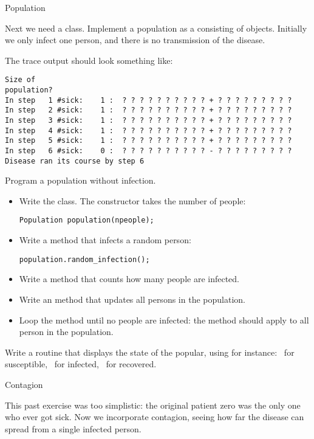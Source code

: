  {Population}

\prerequisite{\ref{ch:array}}

Next we need a  class. Implement a population as a 
consisting of  objects. Initially we only infect one person, and there
is no transmission of the disease.

The trace output should look something like:
\begin{verbatim}
Size of
population?
In step   1 #sick:    1 :  ? ? ? ? ? ? ? ? ? ? + ? ? ? ? ? ? ? ? ?
In step   2 #sick:    1 :  ? ? ? ? ? ? ? ? ? ? + ? ? ? ? ? ? ? ? ?
In step   3 #sick:    1 :  ? ? ? ? ? ? ? ? ? ? + ? ? ? ? ? ? ? ? ?
In step   4 #sick:    1 :  ? ? ? ? ? ? ? ? ? ? + ? ? ? ? ? ? ? ? ?
In step   5 #sick:    1 :  ? ? ? ? ? ? ? ? ? ? + ? ? ? ? ? ? ? ? ?
In step   6 #sick:    0 :  ? ? ? ? ? ? ? ? ? ? - ? ? ? ? ? ? ? ? ?
Disease ran its course by step 6
\end{verbatim}

\begin{exercise}
  \label{ex:infect:notransfer}
  Program a population without infection.
  \begin{itemize}
  \item Write the  class. The constructor takes the number of people:
\begin{verbatim}
Population population(npeople);  
\end{verbatim}
  \item Write a method that infects a random person:
\begin{verbatim}
population.random_infection();
\end{verbatim}
  \item Write a method  that counts how many people are infected.
  \item Write an  method that updates all persons in the population.
  \item Loop the  method until no people are infected: the
     method should apply  to
    all person in the population.
  \end{itemize}
\item Write a routine that displays the state of the popular, using
  for instance: ~for susceptible, \n{+}~for infected, \n{-}~for recovered.
\end{exercise}

 {Contagion}

This past exercise was too simplistic: the original patient zero was
the only one who ever got sick.
Now we incorporate contagion, seeing how far the disease can spread
from a single infected person.

